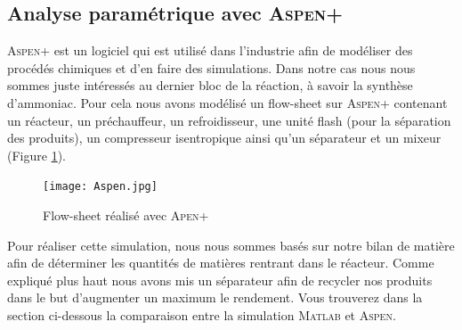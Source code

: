 \subsection{Analyse paramétrique avec \textsc{Aspen+}}
\textsc{Aspen+} est un logiciel qui est utilisé dans l'industrie afin de modéliser des procédés
chimiques et d'en faire des simulations. Dans notre cas nous nous sommes juste intéressés au dernier bloc de la réaction,
à savoir la synthèse d'ammoniac. Pour cela nous avons modélisé un flow-sheet sur \textsc{Aspen+} contenant un réacteur, un
préchauffeur, un refroidisseur, une unité flash (pour la séparation des produits), un compresseur isentropique ainsi qu'un
séparateur et un mixeur (Figure \ref{Aspen}).
\begin{figure}[ht!]
\centering
\texttt{[image: Aspen.jpg]}
\caption{Flow-sheet réalisé avec \textsc{Apen+}}
\label{Aspen}
\end{figure}
Pour réaliser cette simulation, nous nous sommes basés sur notre bilan de matière afin de déterminer les quantités de matières
rentrant dans le réacteur. Comme expliqué plus haut nous avons mis un séparateur afin de recycler nos produits dans le but
d'augmenter un maximum le rendement. Vous trouverez dans la section ci-dessous la comparaison entre la simulation \textsc{Matlab}
et \textsc{Aspen}.


